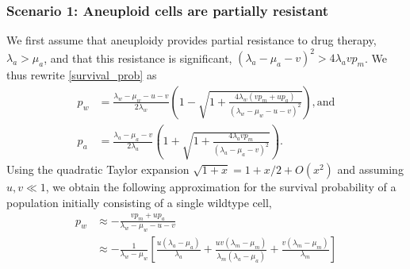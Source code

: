 \documentclass[12pt]{extarticle}
\begin{document}
\subsubsection*{Scenario 1: Aneuploid cells are partially resistant} 

We first assume that aneuploidy provides partial resistance to drug therapy, $\lambda_a>\mu_a$, and that this resistance is significant, $\left(\lambda_a-\mu_a-v\right)^2 > 4\lambda_a v p_m$.
We thus rewrite \cref{survival_prob} as
\begin{align*}
p_w&=\frac{\lambda_w-\mu_w-u-v}{2\lambda_w}\left(1-\sqrt{1+\frac{4\lambda_w\left(vp_m+up_a\right)}{\left(\lambda_w-\mu_w-u-v\right)^2}}\right) ,
\text{and} \\
p_a&=\frac{\lambda_a-\mu_a-v}{2\lambda_a}\left(1+\sqrt{1+\frac{4\lambda_avp_m}{\left(\lambda_a-\mu_a-v\right)^2}}\right) . 
\end{align*}
Using the quadratic Taylor expansion $\sqrt{1+x}=1+x/2+O(x^2)$ and assuming $u,v \ll 1$,
we obtain the following approximation for the survival probability of a population initially consisting of a single wildtype cell,
\begin{align}\label{survprobwapprox1}
p_w 
&\approx -\frac{vp_m+up_a}{\lambda_w-\mu_w-u-v}\\
\nonumber
&\approx-\frac{1}{\lambda_w-\mu_w}\left[\frac{u\left(\lambda_a-\mu_a\right)}{\lambda_a}+\frac{uv\left(\lambda_m-\mu_m\right)}{\lambda_m\left(\lambda_a-\mu_a\right)}+\frac{v\left(\lambda_m-\mu_m\right)}{\lambda_m}\right]\\
\end{align}

\end{document}
